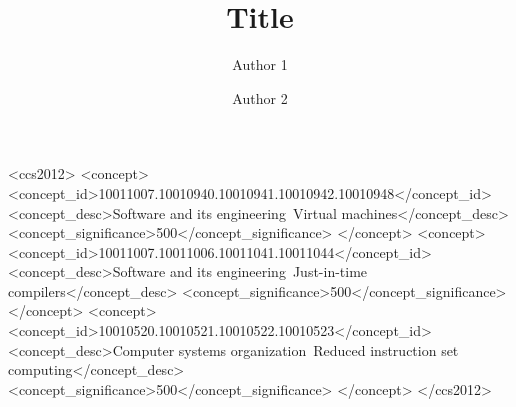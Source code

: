 \documentclass[sigconf]{acmart}
\begin{document}
\title{Title}


\author{Author 1}
\author{Author 2}


\renewcommand{\shortauthors}{Name et al.}



\begin{CCSXML}
  <ccs2012>
     <concept>
         <concept_id>10011007.10010940.10010941.10010942.10010948</concept_id>
         <concept_desc>Software and its engineering~Virtual machines</concept_desc>
         <concept_significance>500</concept_significance>
         </concept>
     <concept>
         <concept_id>10011007.10011006.10011041.10011044</concept_id>
         <concept_desc>Software and its engineering~Just-in-time compilers</concept_desc>
         <concept_significance>500</concept_significance>
         </concept>
     <concept>
         <concept_id>10010520.10010521.10010522.10010523</concept_id>
         <concept_desc>Computer systems organization~Reduced instruction set computing</concept_desc>
         <concept_significance>500</concept_significance>
         </concept>
   </ccs2012>
\end{CCSXML}
 
\end{document}
